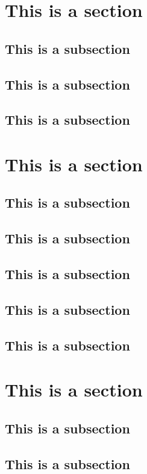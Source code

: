 \documentclass[11pt,oneside]{book}
\begin{document}
\section{This is a section}

\subsection{This is a subsection}
\subsection{This is a subsection}
\subsection{This is a subsection}

\section{This is a section}

\subsection{This is a subsection}
\subsection{This is a subsection}
\subsection{This is a subsection}
\subsection{This is a subsection}
\subsection{This is a subsection}

\section{This is a section}

\subsection{This is a subsection}
\subsection{This is a subsection}
\end{document}
